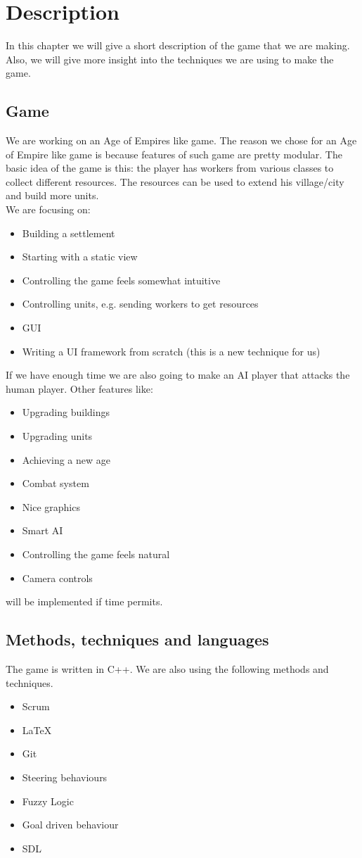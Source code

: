 \section{Description}
In this chapter we will give a short description of the game that we are making. Also, we will give more insight into the techniques we are using to make the game.

\subsection{Game}
We are working on an Age of Empires like game. The reason we chose for an Age of Empire like game is because features of such game are pretty modular. The basic idea of the game is this: the player has workers from various classes to collect different resources. The resources can be used to extend his village/city and build more units. ~\\
We are focusing on:
\begin{itemize}
  \item Building a settlement
  \item Starting with a static view
  \item Controlling the game feels somewhat intuitive
  \item Controlling units, e.g. sending workers to get resources
  \item GUI
  \item Writing a UI framework from scratch (this is a new technique for us)
\end{itemize}

If we have enough time we are also going to make an AI player that attacks the human player. Other features like:
\begin{itemize}
  \item Upgrading buildings
  \item Upgrading units
  \item Achieving a new age
  \item Combat system
  \item Nice graphics
  \item Smart AI
  \item Controlling the game feels natural
  \item Camera controls
\end{itemize}
will be implemented if time permits.

\subsection{Methods, techniques and languages}
The game is written in C++. We are also using the following methods and techniques.
\begin{itemize}
  \item Scrum
  \item \LaTeX
  \item Git
  \item Steering behaviours
  \item Fuzzy Logic
  \item Goal driven behaviour
  \item SDL
\end{itemize}